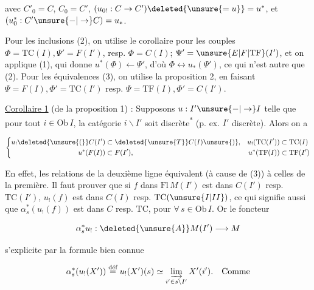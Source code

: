  avec $C'_0=C$, $C_0=C'$, $(u_{0!}:C\to C')\deleted{\unsure{=u}}=u^*$, et $(u_0^*:C'\unsure{-|\to}C)=u_*$.

Pour les  inclusions (2), on utilise le corollaire  pour les couples $\Phi=\mathrm{TC}(I),\Psi'=F(I')$, resp. $\Phi=C(I)$; $\Psi'=\unsure{E|F|\mathrm{TF}}(I')$, et on applique (1), qui donne $u^*(\Phi)\leftarrow\Psi'$, d'où $\Phi\longleftrightarrow u_*(\Psi')$, ce qui n'est autre que (2). Pour les équivalences (3), on utilise la proposition 2, en faisant $\Psi=F(I),\Phi'=\mathrm{TC}(I')$ resp. $\Psi=\mathrm{TF}(I),\Phi'=C(I')$.

\uline{Corollaire 1} (de la proposition 1) : Supposons $u:I'\unsure{-|\to}I$ telle que pour tout $i\in\mathrm{Ob}\,I$, la catégorie $i\backslash I'$ soit discrète\textsuperscript{*}  (p. ex. $I'$ discrète). Alors on a



\[ \left\{\begin{aligned}
u_!\deleted{\unsure{(}}C(I')&\subset\deleted{\unsure{T}}C(I)\unsure{)},&u_!(\mathrm{TC}(I'))&\subset\mathrm{TC}(I)\\
u^*(F(I))&\subset F(I'),&u^*(\mathrm{TF}(I))&\subset\mathrm{TF}(I')
\end{aligned}\right. \]

En effet, les relations de la deuxième ligne équivalent (à cause de (3)) à celles de la première. Il faut prouver que si $f$ dans $\mathrm{Fl}\,M(I')$ est dans $C(I')$ resp. $\mathrm{TC}(I')$, $u_!(f)$ est dans $C(I)$ resp. $\mathrm{TC}(\unsure{I|II})$, ce qui signifie aussi que $\alpha_s^*(u_!(f))$ est dans $C$ resp. $\mathrm{TC}$, pour $\forall\,s\in\mathrm{Ob}\,I$. Or le foncteur

\[ \alpha_s^*u_!:\deleted{\unsure{A}}M(I')\longrightarrow M \]

s'explicite par la formule bien connue

\[ \alpha_s^*(u_!(X'))\overset{\text{déf}}{=}u_!(X')(s)\simeq\varinjlim_{i'\in s\backslash I'}X'(i').\quad\text{Comme} \]


